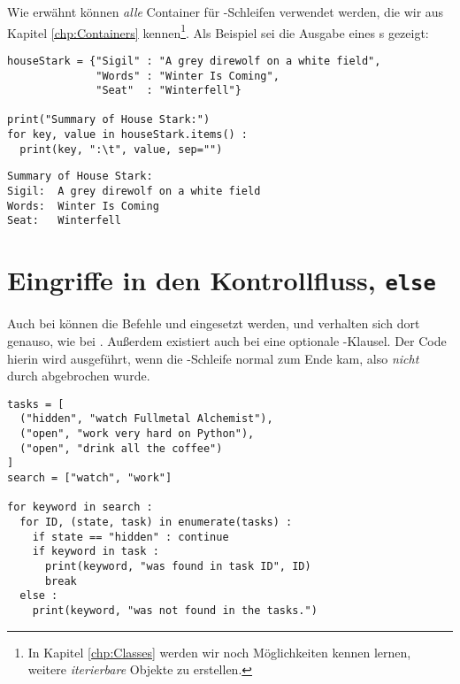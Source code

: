 Wie erwähnt können \emph{alle} Container für -Schleifen verwendet werden, die wir aus Kapitel \ref{chp:Containers} kennen\footnote{In Kapitel \ref{chp:Classes} werden wir noch Möglichkeiten kennen lernen, weitere \emph{iterierbare} Objekte zu erstellen.}. Als Beispiel sei die Ausgabe eines s gezeigt:
\begin{codebox}
\begin{verbatim}
houseStark = {"Sigil" : "A grey direwolf on a white field",
              "Words" : "Winter Is Coming",
              "Seat"  : "Winterfell"}

print("Summary of House Stark:")
for key, value in houseStark.items() :
  print(key, ":\t", value, sep="")
\end{verbatim}
\end{codebox}

\begin{cmdbox}
\begin{verbatim}
Summary of House Stark:
Sigil:  A grey direwolf on a white field
Words:  Winter Is Coming
Seat:   Winterfell
\end{verbatim}
\end{cmdbox}



\section{Eingriffe in den Kontrollfluss, \texttt{else}}
Auch bei  können die Befehle  und  eingesetzt werden, und verhalten sich dort genauso, wie bei . Außerdem existiert auch bei  eine optionale -Klausel. Der Code hierin wird ausgeführt, wenn die -Schleife normal zum Ende kam, also \emph{nicht} durch  abgebrochen wurde.

\begin{codebox}
\begin{verbatim}
tasks = [
  ("hidden", "watch Fullmetal Alchemist"),
  ("open", "work very hard on Python"),
  ("open", "drink all the coffee")
]
search = ["watch", "work"]

for keyword in search :
  for ID, (state, task) in enumerate(tasks) :
    if state == "hidden" : continue
    if keyword in task :
      print(keyword, "was found in task ID", ID)
      break
  else :
    print(keyword, "was not found in the tasks.")
\end{verbatim}
\end{codebox}

